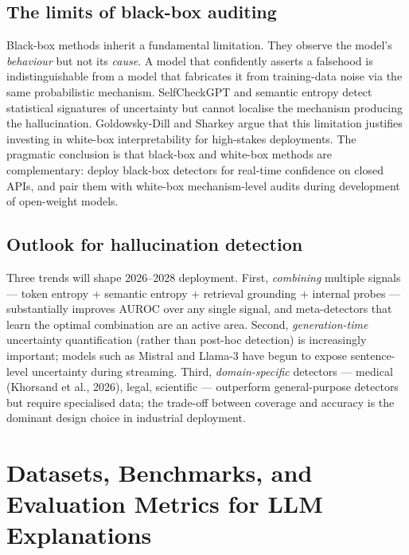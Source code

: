 \documentclass{article}
\begin{document}
\subsection{The limits of black-box auditing}\label{the-limits-of-black-box-auditing}

Black-box methods inherit a fundamental limitation. They observe the model's \emph{behaviour} but not its \emph{cause}. A model that confidently asserts a falsehood is indistinguishable from a model that fabricates it from training-data noise via the same probabilistic mechanism. SelfCheckGPT and semantic entropy detect statistical signatures of uncertainty but cannot localise the mechanism producing the hallucination. Goldowsky-Dill and Sharkey \citet{sharkey2025openproblemsinmech} argue that this limitation justifies investing in white-box interpretability for high-stakes deployments. The pragmatic conclusion is that black-box and white-box methods are complementary: deploy black-box detectors for real-time confidence on closed APIs, and pair them with white-box mechanism-level audits during development of open-weight models.

\subsection{Outlook for hallucination detection}\label{outlook-for-hallucination-detection}

Three trends will shape 2026--2028 deployment. First, \emph{combining} multiple signals --- token entropy + semantic entropy + retrieval grounding + internal probes --- substantially improves AUROC over any single signal, and meta-detectors that learn the optimal combination are an active area. Second, \emph{generation-time} uncertainty quantification (rather than post-hoc detection) is increasingly important; models such as Mistral and Llama-3 have begun to expose sentence-level uncertainty during streaming. Third, \emph{domain-specific} detectors --- medical (Khorsand et al., 2026), legal, scientific --- outperform general-purpose detectors but require specialised data; the trade-off between coverage and accuracy is the dominant design choice in industrial deployment.

\section{Datasets, Benchmarks, and Evaluation Metrics for LLM Explanations}\label{datasets-benchmarks-and-evaluation-metrics-for-llm-explanations}
\end{document}

